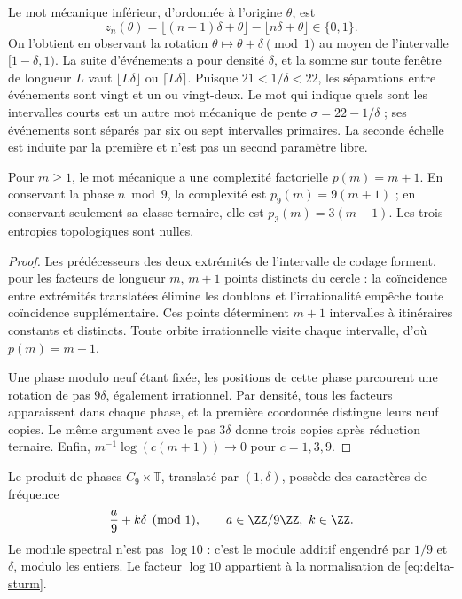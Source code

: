 Le mot mécanique inférieur, d'ordonnée à l'origine \(\theta\), est
\[
 z_n(\theta)=\lfloor(n+1)\delta+\theta\rfloor-\lfloor n\delta+\theta\rfloor\in\{0,1\}.
\]
On l'obtient en observant la rotation \(\theta\mapsto\theta+\delta\pmod1\) au moyen de l'intervalle \([1-\delta,1)\). La suite d'événements a pour densité \(\delta\), et la somme sur toute fenêtre de longueur \(L\) vaut \(\lfloor L\delta\rfloor\) ou \(\lceil L\delta\rceil\). Puisque \(21<1/\delta<22\), les séparations entre événements sont vingt et un ou vingt-deux. Le mot qui indique quels sont les intervalles courts est un autre mot mécanique de pente \(\sigma=22-1/\delta\) ; ses événements sont séparés par six ou sept intervalles primaires. La seconde échelle est induite par la première et n'est pas un second paramètre libre.



\begin{theorem}
Pour \(m\ge1\), le mot mécanique a une complexité factorielle \(p(m)=m+1\). En conservant la phase \(n\bmod9\), la complexité est \(p_9(m)=9(m+1)\) ; en conservant seulement sa classe ternaire, elle est \(p_3(m)=3(m+1)\). Les trois entropies topologiques sont nulles.
\end{theorem}
\begin{proof}
Les prédécesseurs des deux extrémités de l'intervalle de codage forment, pour les facteurs de longueur \(m\), \(m+1\) points distincts du cercle : la coïncidence entre extrémités translatées élimine les doublons et l'irrationalité empêche toute coïncidence supplémentaire. Ces points déterminent \(m+1\) intervalles à itinéraires constants et distincts. Toute orbite irrationnelle visite chaque intervalle, d'où \(p(m)=m+1\).

Une phase modulo neuf étant fixée, les positions de cette phase parcourent une rotation de pas \(9\delta\), également irrationnel. Par densité, tous les facteurs apparaissent dans chaque phase, et la première coordonnée distingue leurs neuf copies. Le même argument avec le pas \(3\delta\) donne trois copies après réduction ternaire. Enfin, \(m^{-1}\log(c(m+1))\to0\) pour \(c=1,3,9\).
\end{proof}

Le produit de phases \(C_9\times\mathbb T\), translaté par \((1,\delta)\), possède des caractères de fréquence
\[
 \frac a9+k\delta\pmod1,\qquad a\in\ZZ/9\ZZ,\ k\in\ZZ.
\]
Le module spectral n'est pas \(\log10\) : c'est le module additif engendré par \(1/9\) et \(\delta\), modulo les entiers. Le facteur \(\log10\) appartient à la normalisation de \eqref{eq:delta-sturm}.

